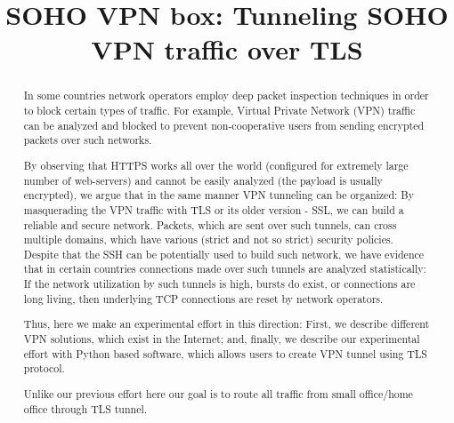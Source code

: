 \documentclass[conference,10pt,letter]{IEEEtran}
\begin{document}
\sloppy
\title{SOHO VPN box: Tunneling SOHO VPN traffic over TLS}
\maketitle
\begin{abstract}

In some countries network operators employ deep packet inspection techniques 
in order to block certain types of traffic. For example, Virtual Private Network 
(VPN) traffic can be analyzed and blocked to prevent non-cooperative users from 
sending encrypted packets over such networks. 

By observing that HTTPS works all over the world (configured for extremely large
number of web-servers) and cannot be easily analyzed (the payload is usually encrypted),
we argue that in the same manner VPN tunneling can be organized: By masquerading 
the VPN traffic with TLS or its older version - SSL, we can build a reliable and 
secure network. Packets, which are sent over such tunnels, can cross multiple
domains, which have various (strict and not so strict) security policies. 
Despite that the SSH can be potentially used to build such network, 
we have evidence that in certain countries connections
made over such tunnels are analyzed statistically: If the network utilization by 
such tunnels is high, bursts do exist, or connections are long living, then 
underlying TCP connections are reset by network operators. 

Thus, here we make an experimental effort in this direction: 
First, we describe different VPN solutions, which exist in the Internet; 
and, finally, we describe our experimental effort with Python based software,
which allows users to create VPN tunnel using TLS protocol. 

Unlike our previous effort here our goal is to route all traffic from small
office/home office through TLS tunnel.

\end{abstract}







\end{document}
